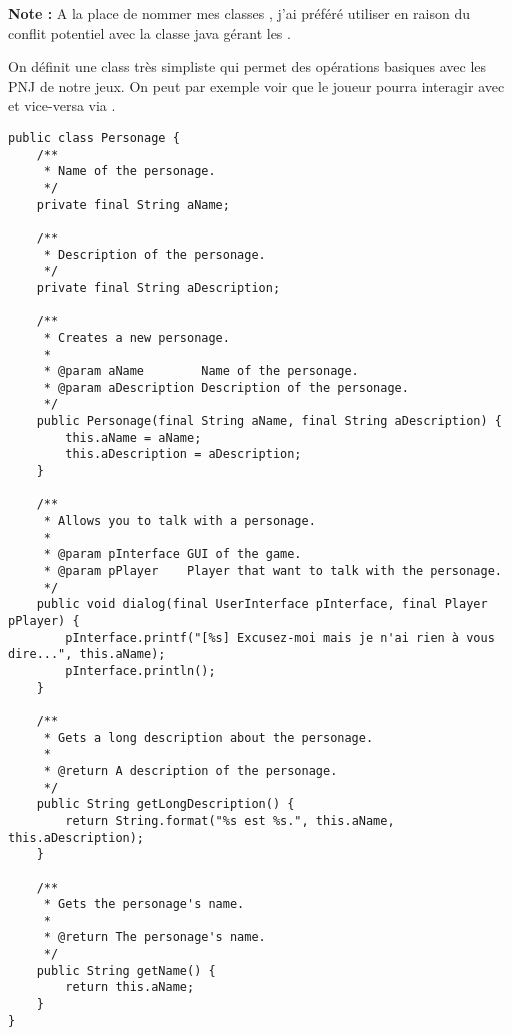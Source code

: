 \begin{exercise}[subtitle=Character]

\textbf{Note :} A la place de nommer mes classes , j'ai préféré utiliser  en raison du conflit potentiel avec la classe java gérant les .

On définit une class  très simpliste qui permet des opérations basiques avec les PNJ de notre jeux. On peut par exemple voir que le joueur pourra interagir avec et vice-versa via .

\begin{verbatim}
public class Personage {
    /**
     * Name of the personage.
     */
    private final String aName;

    /**
     * Description of the personage.
     */
    private final String aDescription;

    /**
     * Creates a new personage.
     *
     * @param aName        Name of the personage.
     * @param aDescription Description of the personage.
     */
    public Personage(final String aName, final String aDescription) {
        this.aName = aName;
        this.aDescription = aDescription;
    }

    /**
     * Allows you to talk with a personage.
     *
     * @param pInterface GUI of the game.
     * @param pPlayer    Player that want to talk with the personage.
     */
    public void dialog(final UserInterface pInterface, final Player pPlayer) {
        pInterface.printf("[%s] Excusez-moi mais je n'ai rien à vous dire...", this.aName);
        pInterface.println();
    }

    /**
     * Gets a long description about the personage.
     *
     * @return A description of the personage.
     */
    public String getLongDescription() {
        return String.format("%s est %s.", this.aName, this.aDescription);
    }

    /**
     * Gets the personage's name.
     *
     * @return The personage's name.
     */
    public String getName() {
        return this.aName;
    }
}
\end{verbatim}

\end{exercise}

